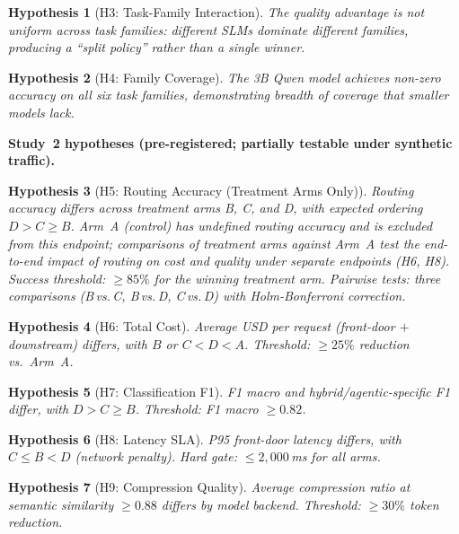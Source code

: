 \documentclass{article}
\newtheorem{hypothesis}{Hypothesis}
\begin{document}
\begin{hypothesis}[H3: Task-Family Interaction]
\label{hyp:family}
\emph{The quality advantage is not uniform across task families: different SLMs dominate different families, producing a ``split policy'' rather than a single winner.}
\end{hypothesis}

\begin{hypothesis}[H4: Family Coverage]
\label{hyp:coverage}
\emph{The 3B Qwen model achieves non-zero accuracy on all six task families, demonstrating breadth of coverage that smaller models lack.}
\end{hypothesis}

\textbf{Study~2 hypotheses (pre-registered; partially testable under synthetic traffic).}

\begin{hypothesis}[H5: Routing Accuracy (Treatment Arms Only)]
\label{hyp:routing}
\emph{Routing accuracy differs across treatment arms B, C, and D, with expected ordering $D > C \geq B$. Arm~A (control) has undefined routing accuracy and is excluded from this endpoint; comparisons of treatment arms against Arm~A test the end-to-end impact of routing on cost and quality under separate endpoints (H6, H8). Success threshold: $\geq 85\%$ for the winning treatment arm. Pairwise tests: three comparisons (B\,vs.\,C, B\,vs.\,D, C\,vs.\,D) with Holm-Bonferroni correction.}
\end{hypothesis}

\begin{hypothesis}[H6: Total Cost]
\label{hyp:cost}
\emph{Average USD per request (front-door $+$ downstream) differs, with $B$ or $C < D < A$. Threshold: $\geq 25\%$ reduction vs.\ Arm~A.}
\end{hypothesis}

\begin{hypothesis}[H7: Classification F1]
\label{hyp:f1}
\emph{F1 macro and hybrid/agentic-specific F1 differ, with $D > C \geq B$. Threshold: F1 macro $\geq 0.82$.}
\end{hypothesis}

\begin{hypothesis}[H8: Latency SLA]
\label{hyp:latency-rct}
\emph{P95 front-door latency differs, with $C \leq B < D$ (network penalty). Hard gate: $\leq 2{,}000$\,ms for all arms.}
\end{hypothesis}

\begin{hypothesis}[H9: Compression Quality]
\label{hyp:compression}
\emph{Average compression ratio at semantic similarity $\geq 0.88$ differs by model backend. Threshold: $\geq 30\%$ token reduction.}
\end{hypothesis}
\end{document}
